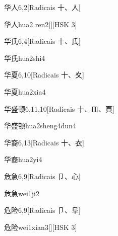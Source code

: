 \begin{entry}{华人}{6,2}[Radicais ⼗、⼈]
  \begin{phonetics}{华人}{hua2 ren2}[][HSK 3]
  \end{phonetics}
\end{entry}

\begin{entry}{华氏}{6,4}[Radicais ⼗、⽒]
  \begin{phonetics}{华氏}{hua2shi4}
  \end{phonetics}
\end{entry}

\begin{entry}{华夏}{6,10}[Radicais ⼗、⼢]
  \begin{phonetics}{华夏}{hua2xia4}
  \end{phonetics}
\end{entry}

\begin{entry}{华盛顿}{6,11,10}[Radicais ⼗、⽫、⾴]
  \begin{phonetics}{华盛顿}{hua2sheng4dun4}
  \end{phonetics}
\end{entry}

\begin{entry}{华裔}{6,13}[Radicais ⼗、⾐]
  \begin{phonetics}{华裔}{hua2yi4}
  \end{phonetics}
\end{entry}

\begin{entry}{危急}{6,9}[Radicais ⼙、⼼]
  \begin{phonetics}{危急}{wei1ji2}
  \end{phonetics}
\end{entry}

\begin{entry}{危险}{6,9}[Radicais ⼙、⾩]
  \begin{phonetics}{危险}{wei1xian3}[][HSK 3]
  \end{phonetics}
\end{entry}

